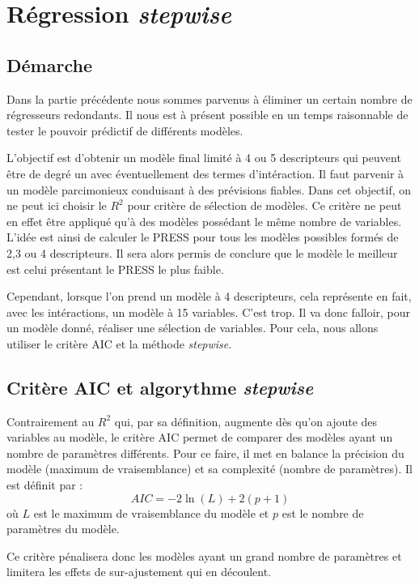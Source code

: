 
\chapter {Régression \emph{stepwise}}

\section{Démarche}

Dans la partie précédente nous sommes parvenus à éliminer un certain nombre de régresseurs redondants. Il nous est à présent possible en un temps raisonnable de tester le pouvoir prédictif de différents modèles. 

L'objectif est d'obtenir un modèle final limité à 4 ou 5 descripteurs qui peuvent être de degré un avec éventuellement des termes d'intéraction. Il faut parvenir à un modèle parcimonieux conduisant à des prévisions fiables. 
Dans cet objectif, on ne peut ici choisir le $R^2$ pour critère de sélection de modèles. Ce critère ne peut en effet être appliqué qu'à des modèles possédant le même nombre de variables.
L'idée est ainsi de calculer le PRESS pour tous les modèles possibles formés de 2,3 ou 4 descripteurs. Il sera alors permis de conclure que le modèle le meilleur est celui présentant le PRESS le plus faible. 

Cependant, lorsque l'on prend un modèle à 4 descripteurs, cela représente en fait, avec les intéractions, un modèle à 15 variables. C'est trop. Il va donc falloir, pour un modèle donné, réaliser une sélection de variables. Pour cela, nous allons utiliser le critère AIC et la méthode \emph{stepwise}.

\section{Critère AIC et algorythme \emph{stepwise}}

Contrairement au $R^2$ qui, par sa définition, augmente dès qu'on ajoute des variables au modèle, le critère AIC permet de comparer des modèles ayant un nombre de paramètres différents. Pour ce faire, il met en balance la précision du modèle (maximum de vraisemblance) et sa complexité (nombre de paramètres). Il est définit par :
\[AIC = -2 \ln{(L)} + 2(p +1)\]
où $L$ est le maximum de vraisemblance du modèle et $p$ est le nombre de paramètres du modèle.

Ce critère pénalisera donc les modèles ayant un grand nombre de paramètres et limitera les effets de sur-ajustement qui en découlent. 

